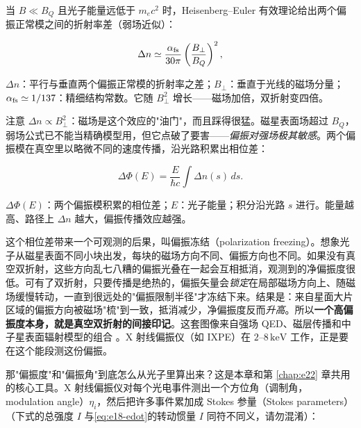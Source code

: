 当 \(B\ll B_Q\) 且光子能量远低于 \(m_ec^2\) 时，Heisenberg–Euler 有效理论给出两个偏振正常模之间的折射率差（弱场近似）：

\begin{equation}
  \Delta n\simeq\frac{\alpha_{\rm fs}}{30\pi}
  \left(\frac{B_\perp}{B_Q}\right)^2 ,
  \label{eq:e18-dn}
\end{equation}
\begin{formulaexplain}
\(\Delta n\)：平行与垂直两个偏振正常模的折射率之差；\(B_\perp\)：垂直于光线的磁场分量；\(\alpha_{\rm fs}\simeq1/137\)：精细结构常数。它随 \(B_\perp^2\) 增长——磁场加倍，双折射变四倍。
\end{formulaexplain}

注意 \(\Delta n\propto B_\perp^2\)：磁场是这个效应的"油门"，而且踩得很猛。磁星表面场超过 \(B_Q\)，弱场公式已不能当精确模型用，但它点破了要害——\emph{偏振对强场极其敏感}。两个偏振模在真空里以略微不同的速度传播，沿光路积累出相位差：

\begin{equation}
  \Delta\Phi(E)=\frac{E}{\hbar c}\int\Delta n(s)\,ds .
  \label{eq:e18-dphi}
\end{equation}
\begin{formulaexplain}
\(\Delta\Phi(E)\)：两个偏振模积累的相位差；\(E\)：光子能量；积分沿光路 \(s\) 进行。能量越高、路径上 \(\Delta n\) 越大，偏振传播效应越强。
\end{formulaexplain}

这个相位差带来一个可观测的后果，叫偏振冻结（polarization freezing）。想象光子从磁星表面不同小块出发，每块的磁场方向不同、偏振方向也不同。如果没有真空双折射，这些方向乱七八糟的偏振光叠在一起会互相抵消，观测到的净偏振度很低。可有了双折射，只要传播是绝热的，偏振矢量会\emph{锁定}在局部磁场方向上、随磁场缓慢转动，一直到很远处的"偏振限制半径"才冻结下来。结果是：来自星面大片区域的偏振方向被磁场"梳"到一致，抵消减少，净偏振度反而\emph{升高}。所以\textbf{一个高偏振度本身，就是真空双折射的间接印记}。这套图像来自强场 QED、磁层传播和中子星表面辐射模型的组合 \citep{1936ZPhy...98..714H,1971AnPhy..67..599A,2000MNRAS.311..555H,2002PhRvD..66b3002H,2003MNRAS.342..134H}。X 射线偏振仪（如 IXPE）在 \(2\)–\(8\,\mathrm{keV}\) 工作，正是要在这个能段测这份偏振。

那"偏振度"和"偏振角"到底怎么从光子里算出来？这是本章和第 \ref{chap:e22} 章共用的核心工具。X 射线偏振仪对每个光电事件测出一个方位角（调制角，modulation angle）\(\eta_i\)，然后把许多事件累加成 Stokes 参量（Stokes parameters）（下式的总强度 \(I\) 与\eqref{eq:e18-edot}的转动惯量 \(I\) 同符不同义，请勿混淆）：

